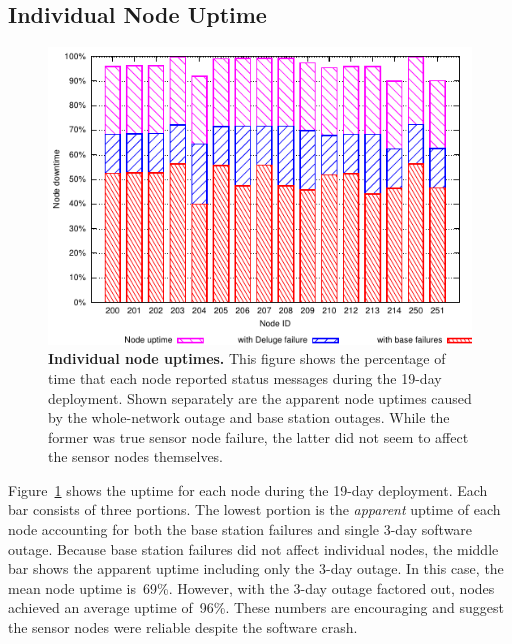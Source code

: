 \subsection{Individual Node Uptime}

\begin{figure}[t]
\begin{center}
\includegraphics[width=\hsize]{./3-evaluation/figs/nodeuptime.pdf}
\end{center}

\caption{\textbf{Individual node uptimes.} This figure shows the percentage
of time that each node reported status messages during the 19-day deployment.
Shown separately are the apparent node uptimes caused by the whole-network
outage and base station outages. While the former was true sensor node
failure, the latter did not seem to affect the sensor nodes themselves.}

\label{evaluation-fig-nodeuptime}
\end{figure}

Figure~\ref{evaluation-fig-nodeuptime} shows the uptime for each node during
the 19-day deployment. Each bar consists of three portions. The lowest
portion is the \textit{apparent} uptime of each node accounting for both the
base station failures and single 3-day software outage. Because base station
failures did not affect individual nodes, the middle bar shows the apparent
uptime including only the 3-day outage. In this case, the mean node uptime
is~69\%. However, with the 3-day outage factored out, nodes achieved an
average uptime of~96\%. These numbers are encouraging and suggest the sensor
nodes were reliable despite the software crash.

